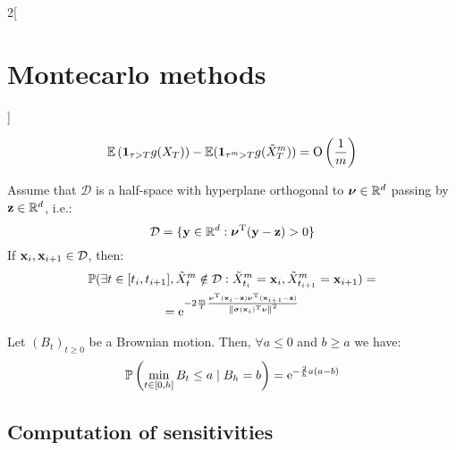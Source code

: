 \documentclass[../../../main_math.tex]{subfiles}
\begin{document}
\begin{multicols}{2}[\section{Montecarlo methods}]
\begin{proposition}
$$      \mathbb{E}\left(\boldsymbol{\mathrm{1}}_{\tau>T}g(X_T) \right)-\mathbb{E}(\boldsymbol{\mathrm{1}}_{\tau^m>T} g(\tilde{X}^m_T))=\mathrm{O}\left(\frac{1}{m}\right)
    $$
  \end{proposition}
  \begin{proposition}
    Assume that $\mathcal{D}$ is a half-space with hyperplane orthogonal to $\boldsymbol{\mathrm{\nu}}\in\mathbb{R}^d$ passing by $\boldsymbol{\mathrm{z}}\in\mathbb{R}^d$, i.e.:
    $$
      \mathcal{D}=\{ \boldsymbol{\mathrm{y}}\in\mathbb{R}^d : {\boldsymbol{\mathrm{\nu}}}^{\mathrm{T}}(\boldsymbol{\mathrm{y}}-\boldsymbol{\mathrm{z}})>0\}
    $$
    If $\boldsymbol{\mathrm{x}}_i,\boldsymbol{\mathrm{x}}_{i+1}\in \mathcal{D}$, then:
    \begin{multline*}
      \mathbb{P}(\exists t\in [t_i,t_{i+1}], \tilde{X}_t^m\notin\mathcal{D}:\tilde{X}_{t_i}^m=\boldsymbol{\mathrm{x}}_i, \tilde{X}_{t_{i+1}}^m=\boldsymbol{\mathrm{x}}_{i+1})=\\=\mathrm{e}^{
        -2\frac{m}{T}\frac{{\boldsymbol{\mathrm{\nu}}}^{\mathrm{T}}(\boldsymbol{\mathrm{x}}_{i}-\boldsymbol{\mathrm{z}}){\boldsymbol{\mathrm{\nu}}}^{\mathrm{T}}(\boldsymbol{\mathrm{x}}_{i+1}-\boldsymbol{\mathrm{z}})}{\left\|{\boldsymbol{\mathrm{\sigma}}(\boldsymbol{\mathrm{x}}_i)}^{\mathrm{T}}\boldsymbol{\mathrm{\nu}}\right\|^2}
      }
    \end{multline*}
  \end{proposition}
  \begin{lemma}
    Let ${(B_t)}_{t\geq 0}$ be a Brownian motion. Then, $\forall a\leq 0$ and $b\geq a$ we have:
    $$
      \mathbb{P}\left(\min_{t\in[0,h]}B_t\leq a\mid B_h=b\right)=\mathrm{e}^{-\frac{2}{h}a(a-b)}
    $$
  \end{lemma}
  \subsection{Computation of sensitivities}
\end{multicols}
\end{document}
